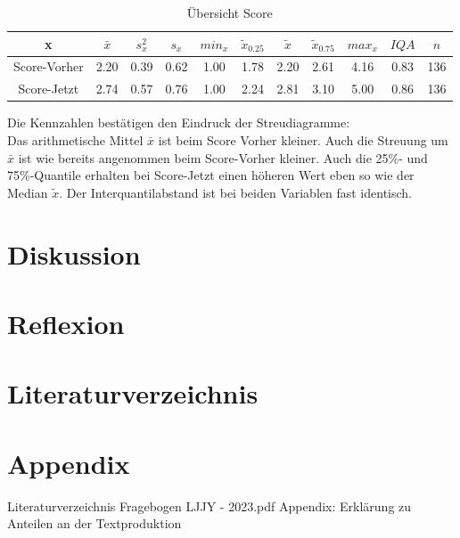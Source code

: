 \documentclass[11pt, a4paper]{article}
\begin{document}
\begin{table}[htb]
	\vspace{-1.5cm}
	\centering
	\begin{tabular}{c|ccccccccc|c}
		x & $\bar{x}$ & $s_x^2$ & $s_x$ & $min_x$ & $\tilde{x}_{0.25}$ & $\tilde{x}$ & $\tilde{x}_{0.75}$ & $max_x$ & $IQA$ & $n$ \\ \hline
		Score-Vorher & 2.20 & 0.39 & 0.62 & 1.00 & 1.78 & 2.20 & 2.61 & 4.16 & 0.83 & 136 \\
		Score-Jetzt & 2.74 & 0.57 & 0.76 & 1.00 & 2.24 & 2.81 & 3.10 & 5.00 & 0.86 & 136
	\end{tabular}
	\caption{Übersicht Score}
\end{table}
	Die Kennzahlen bestätigen den Eindruck der Streudiagramme:\\
Das arithmetische Mittel $\bar{x}$ ist beim Score Vorher kleiner.
Auch die Streuung um $\bar{x}$ ist wie bereits angenommen beim Score-Vorher kleiner. Auch die 25\%- und 75\%-Quantile erhalten bei Score-Jetzt einen höheren Wert eben so wie der Median $\tilde{x}$.
Der Interquantilabstand ist bei beiden Variablen fast identisch.


\leavevmode
\newpage
\section{Diskussion}
\newpage
\section{Reflexion}
\newpage
\newpage
\section{Literaturverzeichnis}
\newpage
\section{Appendix}
 Literaturverzeichnis
\newpage 
 {Fragebogen LJJY - 2023.pdf}
\newpage Appendix: Erklärung zu Anteilen an der Textproduktion
\end{document}
